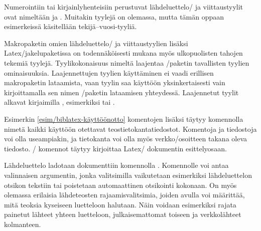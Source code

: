 Numerointiin tai kirjainlyhenteisiin perustuvat lähdeluettelo\-/{} ja
viittaustyylit ovat nimeltään  ja
. Muitakin tyylejä on olemassa, mutta tämän
oppaan esimerkeissä käsitellään tekijä--vuosi-tyyliä.

Makropaketin omien lähdeluettelo\-/{} ja viittaustyylien lisäksi
Latex\-/jakelupaketissa on todennäköisesti mukana myös ulkopuolisten
tahojen tekemiä tyylejä. Tyylikokonaisuus nimeltä
 laajentaa
\-/paketin tavallisten tyylien ominaisuuksia.
Laajennettujen tyylien käyttäminen ei vaadi erillisen makropaketin
lataamista, vaan tyylin saa käyttöön yksinkertaisesti vain
kirjoittamalla sen nimen \-/paketin lataamisen
yhteydessä. Laajennetut tyylit alkavat kirjaimilla \mbox{,}
esimerkiksi  tai .

Esimerkin \ref{esim/biblatex-käyttöönotto} komentojen lisäksi täytyy
komennolla  nimetä kaikki käyttöön otettavat
teostietokantatiedostot. Komentoja ja tiedostoja voi olla useampiakin,
ja tietokanta voi olla myös verkko\-/osoitteen takana oleva tiedosto.
\-/ komennot täytyy kirjoittaa Latex\-/
dokumentin esittelyosaan.

\begin{koodilohkosis}



\end{koodilohkosis}

Lähdeluettelo ladotaan dokumenttiin komennolla
. Komennolle voi antaa valinnaisen
argumentin, jonka valitsimilla vaikutetaan esimerkiksi lähdeluettelon
otsikon tekstiin tai poistetaan automaattinen otsikointi kokonaan. On
myös olemassa erilaisia lähdeteosten rajaamisvalitsimia, joiden avulla
voi määrittää, mitä teoksia kyseiseen luetteloon halutaan. Näin voidaan
esimerkiksi rajata painetut lähteet yhteen luetteloon, julkaisemattomat
toiseen ja verkkolähteet kolmanteen.

\begin{koodilohkosis}
\printbibliography
\printbibliography[title={Lähteet}]
\printbibliography[heading=none,  %
  type=online]           %
\end{koodilohkosis}

